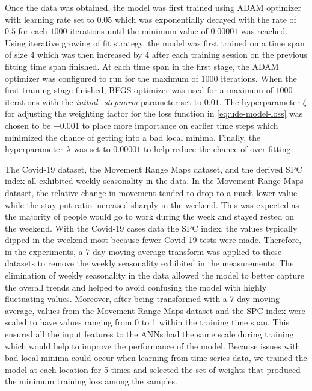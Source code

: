 Once the data was obtained, the model was first trained using ADAM optimizer with learning rate set to $0.05$ which was exponentially decayed with the rate of $0.5$ for each $1000$ iterations until the minimum value of $0.00001$ was reached.
Using iterative growing of fit strategy, the model was first trained on a time span of size 4 which was then increased by 4 after each training session on the previous fitting time span finished.
At each time span in the first stage, the ADAM optimizer was configured to run for the maximum of $1000$ iterations.
When the first training stage finished, BFGS optimizer was used for a maximum of $1000$ iterations with the \textit{initial\_stepnorm} parameter set to $0.01$.
The hyperparameter $\zeta$ for adjusting the weighting factor for the loss function in \autoref{eq:ude-model-loss} was chosen to be $-0.001$ to place more importance on earlier time steps which minimized the chance of getting into a bad local minima.
Finally, the hyperparameter $\lambda$ was set to $0.00001$ to help reduce the chance of over-fitting.

The Covid-19 dataset, the Movement Range Maps dataset, and the derived \gls{SPC} index all exhibited weekly seasonality in the data.
In the Movement Range Maps dataset, the relative change in movement tended to drop to a much lower value while the stay-put ratio increased sharply in the weekend.
This was expected as the majority of people would go to work during the week and stayed rested on the weekend.
With the Covid-19 cases data the \gls{SPC} index, the values typically dipped in the weekend most because fewer Covid-19 tests were made.
Therefore, in the experiments, a 7-day moving average transform was applied to these datasets to remove the weekly seasonality exhibited in the measurements.
The elimination of weekly seasonality in the data allowed the model to better capture the overall trends and helped to avoid confusing the model with highly fluctuating values.
Moreover, after being transformed with a 7-day moving average, values from the Movement Range Maps dataset and the \gls{SPC} index were scaled to have values ranging from 0 to 1 within the training time span.
This ensured all the input features to the \glspl{ANN} had the same scale during training which would help to improve the performance of the model.
Because issues with bad local minima could occur when learning from time series data, we trained the model at each location for 5 times and selected the set of weights that produced the minimum training loss among the samples.